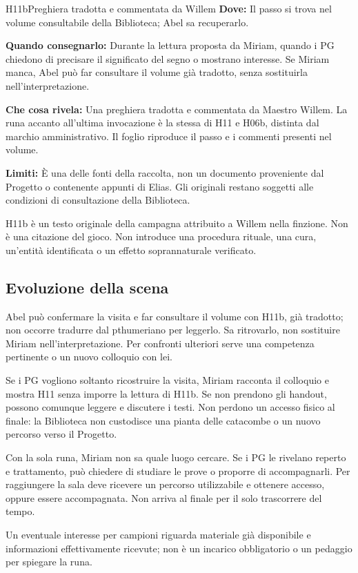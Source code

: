 \documentclass[11pt,a4paper]{article}
\begin{document}
{}
\begin{handoutbox}{H11b}{Preghiera tradotta e commentata da Willem}
\textbf{Dove:} Il passo si trova nel volume consultabile della Biblioteca; Abel sa recuperarlo.

\textbf{Quando consegnarlo:} Durante la lettura proposta da Miriam, quando i PG chiedono di precisare il significato del segno o mostrano interesse. Se Miriam manca, Abel può far consultare il volume già tradotto, senza sostituirla nell'interpretazione.

\textbf{Che cosa rivela:} Una preghiera tradotta e commentata da Maestro Willem. La runa accanto all'ultima invocazione è la stessa di H11 e H06b, distinta dal marchio amministrativo. Il foglio riproduce il passo e i commenti presenti nel volume.

\textbf{Limiti:} È una delle fonti della raccolta, non un documento proveniente dal Progetto o contenente appunti di Elias. Gli originali restano soggetti alle condizioni di consultazione della Biblioteca.
\end{handoutbox}

\begin{gmbox}
H11b è un testo originale della campagna attribuito a Willem nella finzione. Non è una citazione del gioco. Non introduce una procedura rituale, una cura, un'entità identificata o un effetto soprannaturale verificato.
\end{gmbox}

\subsection{Evoluzione della scena}
Abel può confermare la visita e far consultare il volume con H11b, già tradotto; non occorre tradurre dal pthumeriano per leggerlo. Sa ritrovarlo, non sostituire Miriam nell'interpretazione. Per confronti ulteriori serve una competenza pertinente o un nuovo colloquio con lei.

Se i PG vogliono soltanto ricostruire la visita, Miriam racconta il colloquio e mostra H11 senza imporre la lettura di H11b. Se non prendono gli handout, possono comunque leggere e discutere i testi. Non perdono un accesso fisico al finale: la Biblioteca non custodisce una pianta delle catacombe o un nuovo percorso verso il Progetto.

\begin{clockbox}
Con la sola runa, Miriam non sa quale luogo cercare. Se i PG le rivelano reperto e trattamento, può chiedere di studiare le prove o proporre di accompagnarli. Per raggiungere la sala deve ricevere un percorso utilizzabile e ottenere accesso, oppure essere accompagnata. Non arriva al finale per il solo trascorrere del tempo.

Un eventuale interesse per campioni riguarda materiale già disponibile e informazioni effettivamente ricevute; non è un incarico obbligatorio o un pedaggio per spiegare la runa.
\end{clockbox}
\end{document}
